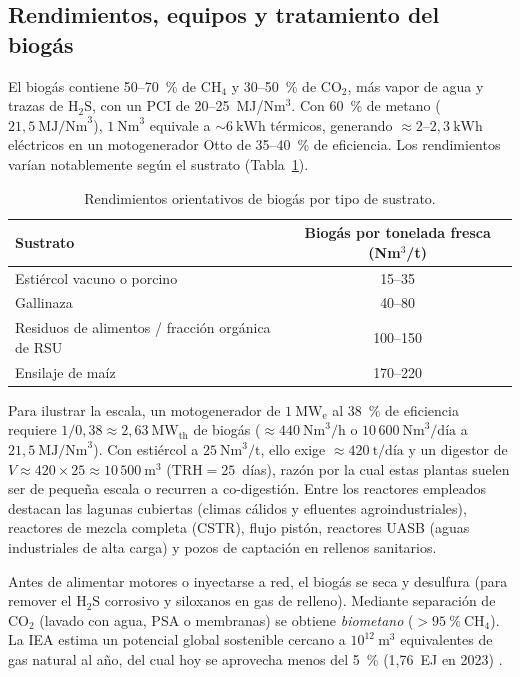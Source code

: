 \subsection{Rendimientos, equipos y tratamiento del biogás}
El biogás contiene 50--70~\% de $\mathrm{CH_4}$ y 30--50~\% de $\mathrm{CO_2}$, más vapor de agua y trazas de $\mathrm{H_2S}$, con un PCI de 20--25~MJ/Nm$^3$. Con 60~\% de metano ($21{,}5~\text{MJ/Nm}^3$), $1~\text{Nm}^3$ equivale a $\sim 6~\text{kWh}$ térmicos, generando $\approx 2\text{--}2{,}3~\text{kWh}$ eléctricos en un motogenerador Otto de 35--40~\% de eficiencia. Los rendimientos varían notablemente según el sustrato (Tabla~\ref{tab:rendimientos_biogas}).

\begin{table}[htbp]
\centering
\caption{Rendimientos orientativos de biogás por tipo de sustrato.}
\label{tab:rendimientos_biogas}
\begin{tabular}{@{}lc@{}}
\toprule
\textbf{Sustrato} & \textbf{Biogás por tonelada fresca (Nm$^3$/t)} \\
\midrule
Estiércol vacuno o porcino & 15--35 \\
Gallinaza & 40--80 \\
Residuos de alimentos / fracción orgánica de RSU & 100--150 \\
Ensilaje de maíz & 170--220 \\
\bottomrule
\end{tabular}
\end{table}

Para ilustrar la escala, un motogenerador de $1~\mathrm{MW_e}$ al 38~\% de eficiencia requiere $1 / 0{,}38 \approx 2{,}63~\mathrm{MW_{th}}$ de biogás ($\approx 440~\text{Nm}^3/\text{h}$ o $10\,600~\text{Nm}^3/\text{día}$ a $21{,}5~\text{MJ/Nm}^3$). Con estiércol a $25~\text{Nm}^3/\text{t}$, ello exige $\approx 420~\text{t/día}$ y un digestor de $V \approx 420 \times 25 \approx 10\,500~\text{m}^3$ ($\mathrm{TRH}=25$~días), razón por la cual estas plantas suelen ser de pequeña escala o recurren a co-digestión. Entre los reactores empleados destacan las lagunas cubiertas (climas cálidos y efluentes agroindustriales), reactores de mezcla completa (CSTR), flujo pistón, reactores UASB (aguas industriales de alta carga) y pozos de captación en rellenos sanitarios.

Antes de alimentar motores o inyectarse a red, el biogás se seca y desulfura (para remover el $\mathrm{H_2S}$ corrosivo y siloxanos en gas de relleno). Mediante separación de $\mathrm{CO_2}$ (lavado con agua, PSA o membranas) se obtiene \textit{biometano} ($>95~\%~\mathrm{CH_4}$). La IEA estima un potencial global sostenible cercano a $10^{12}~\text{m}^3$ equivalentes de gas natural al año, del cual hoy se aprovecha menos del 5~\% (1,76~EJ en 2023) \cite{iea2025biogas, wba2025gbsr}.

